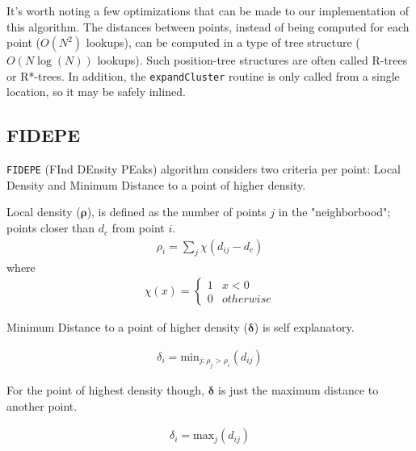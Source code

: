 \documentclass[12pt]{article}
\begin{document}
\par It's worth noting a few optimizations that can be made to our implementation of this algorithm.
The distances between points, instead of being computed for each point ($O(N^2)$ lookups), can be computed in a type of tree structure ($O(N \log(N))$ lookups). Such position-tree structures are often called R-trees or R*-trees.
In addition, the \texttt{expandCluster} routine is only called from a single location, so it may be safely inlined.

\pagebreak

\subsection{FIDEPE}

\texttt{FIDEPE} (FInd DEnsity PEaks) algorithm \cite{FIDEPE} considers two criteria per point: Local Density and Minimum Distance to a point of higher density.

Local density ($\boldsymbol{\rho}$), is defined as the number of points $j$ in the "neighborbood"; points closer than $d_c$ from point $i$.
\begin{align*}
	\rho_i = \sum_j \chi(d_{ij}-d_c)
\end{align*}
where 
\begin{align*}
\chi(x)=
\begin{cases}
1 & x < 0 \\
0 & otherwise
\end{cases}
\end{align*}

Minimum Distance to a point of higher density ($\boldsymbol{\delta}$) is self explanatory. 

\begin{align*}
	\delta_i = \text{min}_{j:\rho_j > \rho_i} (d_{ij})
\end{align*}

For the point of highest density though, $\boldsymbol{\delta}$ is just the maximum distance to another point.

\begin{align*}
	\delta_i = \text{max}_{j} (d_{ij})
\end{align*}
\end{document}
